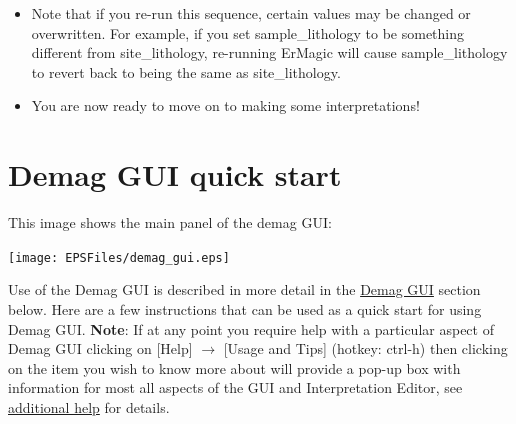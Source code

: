 \documentclass[11pt]{book}
\begin{document}
{\begin{itemize}
\texttt{[image: EPSFiles/FigErMagicStep6.eps]}

\item Note that if you re-run this sequence, certain values may be changed or overwritten.  For example, if you set sample\_lithology to be something different from site\_lithology, re-running ErMagic will cause sample\_lithology to revert back to being the same as site\_lithology.
\item You are now ready to move on to making some interpretations!


\end{itemize}


\section{Demag GUI quick start}
\label{sect:demag_gui}

This image shows the main panel of the demag GUI:

\texttt{[image: EPSFiles/demag\_gui.eps]}

Use of the Demag GUI is described in more detail in the \href{#demag_gui.py}{Demag GUI} section below. Here are a few instructions that can be used as a quick start for using Demag GUI. {\bf Note}: If at any point you require help with a particular aspect of Demag GUI clicking on [Help] $\rightarrow$ [Usage and Tips] (hotkey: ctrl-h) then clicking on the item you wish to know more about will provide a pop-up box with information for most all aspects of the GUI and Interpretation Editor, see \hyperref[add-help]{additional help} for details.

}
\end{document}
